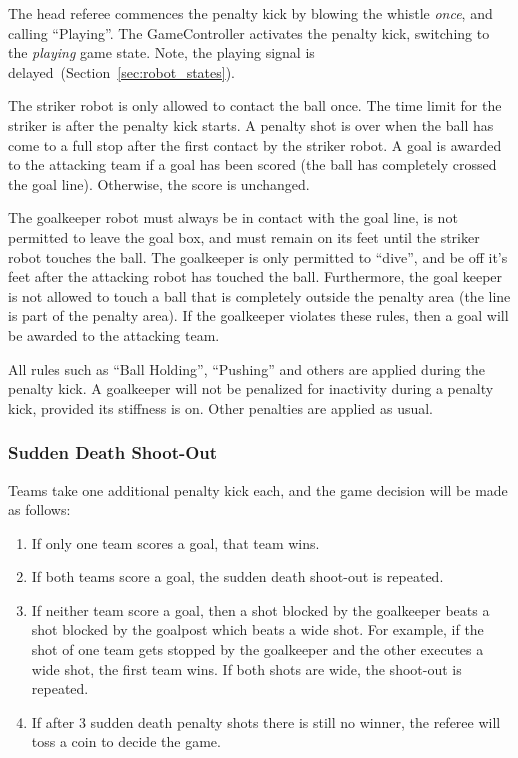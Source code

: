 The head referee commences the penalty kick by blowing the whistle \textit{once}, and calling ``Playing''.
The GameController activates the penalty kick, switching to the \emph{playing} game state.
Note, the playing signal is delayed~(\cf Section~\ref{sec:robot_states}).

The striker robot is only allowed to contact the ball once.
The time limit for the striker is \PenaltyKickTime after the penalty kick starts.
A penalty shot is over when the ball has come to a full stop after the first contact by the striker robot.
A goal is awarded to the attacking team if a goal has been scored (\ie the ball has completely crossed the goal line).
Otherwise, the score is unchanged.

The goalkeeper robot must always be in contact with the goal line, is not permitted to leave the goal box, and must remain on its feet until the striker robot touches the ball.
The goalkeeper is only permitted to ``dive'', and be off it's feet after the attacking robot has touched the ball.
Furthermore, the goal keeper is not allowed to touch a ball that is completely outside the penalty area (the line is part of the penalty area).
If the goalkeeper violates these rules, then a goal will be awarded to the attacking team.

All rules such as ``Ball Holding'', ``Pushing'' and others are applied during the penalty kick.
A goalkeeper will not be penalized for inactivity during a penalty kick, provided its stiffness is on.
Other penalties are applied as usual.

\subsubsection{Sudden Death Shoot-Out}
\label{sec:sudden_death_shoot_out}

Teams take one additional penalty kick each, and the game decision will be made as follows:

\begin{enumerate}
  \item If only one team scores a goal, that team wins.
  \item If both teams score a goal, the sudden death shoot-out is repeated.
  \item If neither team score a goal, then a shot blocked by the goalkeeper beats a shot blocked by the goalpost which beats a wide shot. For example, if the shot of one team gets stopped by the goalkeeper and the other executes a wide shot, the first team wins. If both shots are wide, the shoot-out is repeated.
  \item If after 3 sudden death penalty shots there is still no winner, the referee will toss a coin to decide the game.
\end{enumerate}
